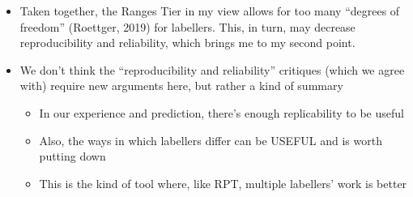 \documentclass[11pt, twoside]{memoir}
\begin{document}
\begin{itemize}
\begin{itemize}
\begin{itemize}
    \item
      many people may have discomfort with labelling in a way others
      might not. to address this, you can think of PoLaR as a log of
      \textbf{the annotator's perception} (and not as some indisputable
      objective truth about the intonation) ---~even when it's
      ambiguous.\\
    \item
      we're missing things by virtue of not being willing to address and
      resolve disagreements\\
    \end{itemize}
  \item
    instead, the target is to get labels that yield both
    \textbf{similar-enough} measures of f0 size/extrema and identical
    Levels labels.

    \begin{itemize}
    \tightlist
    \item
      since f0 size/extrema measures are inherently imprecise, we don't
      view variation as a problem. (people don't always recognize that a
      single number from a computer with multiple decimals is still
      imprecise.)\\
    \end{itemize}
  \item
    Since the amount of precision required to get the same Levels is
    rather low (since each level occupies 20\% of the size of the pitch
    range), and since labellers are encouraged to discuss with each
    other (and could use same-Levels as a metric for Ranges-label
    agreement), we don't think this requires rethinking as much as it
    requires clarification on \textbf{what} we're thinking.\\
  \end{itemize}
\item
  Taken together, the Ranges Tier in my view allows for too many
  ``degrees of freedom'' (Roettger, 2019) for labellers. This, in turn,
  may decrease reproducibility and reliability, which brings me to my
  second point.\\
\item
  We don't think the ``reproducibility and reliability'' critiques
  (which we agree with) require new arguments here, but rather a kind of
  summary

  \begin{itemize}
  \tightlist
  \item
    In our experience and prediction, there's enough replicability to be
    useful\\
  \item
    Also, the ways in which labellers differ can be USEFUL and is worth
    putting down\\
  \item
    This is the kind of tool where, like RPT, multiple labellers' work
    is better
  \end{itemize}
\end{itemize}
	
\end{document}
